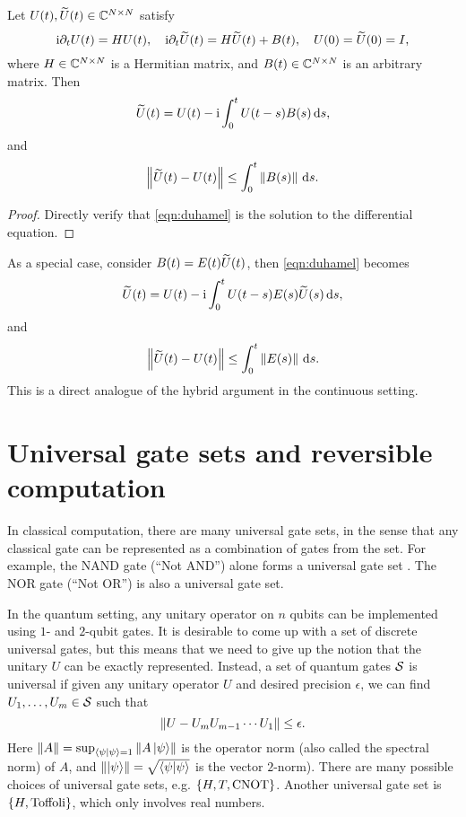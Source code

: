 \begin{prop}
Let $U(t),\widetilde{U}(t)\in \mathbb{C}^{N\times N}$ satisfy
\begin{equation}
\mathrm{i} \partial_t U(t)=H U(t), \quad \mathrm{i} \partial_t\widetilde{U}(t)=H\widetilde{U}(t)+B(t), \quad U(0)=\widetilde{U}(0)=I,
\end{equation}
where $H\in \mathbb{C}^{N\times N}$ is a Hermitian matrix, and $B(t)\in \mathbb{C}^{N\times N}$ is an arbitrary matrix. 
Then
\begin{equation}
\widetilde{U}(t)=U(t)-\mathrm{i}\int_0^t U(t-s) B(s) \,\mathrm{d} s,
\label{eqn:duhamel}
\end{equation}
and
\begin{equation}
\left\lVert\widetilde{U}(t)-U(t)\right\rVert\le \int_{0}^t \left\lVert B(s)\right\rVert\,\mathrm{d} s.
\end{equation}
\label{prop:duhamel}
\end{prop}
\begin{proof}
Directly verify that \cref{eqn:duhamel} is the solution to the differential equation.
\end{proof}
As a special case, consider $B(t)=E(t)\widetilde{U}(t)$, then \cref{eqn:duhamel} becomes
\begin{equation}
\widetilde{U}(t)=U(t)-\mathrm{i}\int_0^t U(t-s) E(s) \widetilde{U}(s) \,\mathrm{d} s,
\end{equation}
and
\begin{equation}
\left\lVert\widetilde{U}(t)-U(t)\right\rVert\le \int_{0}^t \left\lVert E(s)\right\rVert\,\mathrm{d} s.
\end{equation}
This is a direct analogue of the hybrid argument in the continuous setting.

\section{Universal gate sets and reversible computation}

In classical computation, there are many universal gate sets, in the sense that any classical gate can be represented as a combination of gates from the set.
For example, the NAND gate (``Not AND'') alone forms a universal gate set \cite[Section 3.1.2]{NielsenChuang2000}. The NOR gate (``Not OR'') is also a universal gate set.

In the quantum setting, any unitary operator on $n$ qubits can be implemented using $1$- and $2$-qubit gates\cite[Section 4.5]{NielsenChuang2000}. 
It is desirable to come up with a  set of discrete universal gates, but this means that we need to give up the notion that the unitary $U$ can be exactly represented. 
Instead, a set of quantum gates $\mathcal{S}$ is universal if given any unitary operator $U$ and desired precision $\epsilon$, we can find $U_1,\ldots,U_m\in \mathcal{S}$ such that
\begin{equation}
  \left\lVert U-U_m U_{m-1} \cdots U_1\right\rVert \le \epsilon.
\end{equation}
Here $\left\lVert A\right\rVert=\sup_{\braket{\psi|\psi}=1} \left\lVert A\ket{\psi}\right\rVert$ is the operator norm (also called the spectral norm) of $A$, and $\left\lVert\ket{\psi}\right\rVert=\sqrt{\braket{\psi|\psi}}$ is the vector $2$-norm).  There are many possible choices of universal gate sets, e.g. $\{H,T,\operatorname{CNOT}\}$. Another universal gate set is $\{H,\operatorname{Toffoli}\}$, which only involves real numbers.

